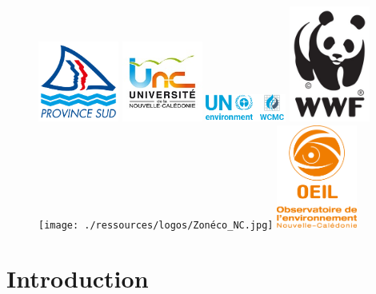 \documentclass[
  11pt,
  letterpaper,
]{scrreprt}
\begin{document}
\begin{figure}
\begin{minipage}{\linewidth}
\includegraphics[width=1.04167in,height=\textheight]{./ressources/logos/province_sud.png}
\includegraphics[width=1.04167in,height=\textheight]{./ressources/logos/UNC_160.jpg}
\includegraphics[width=1.04167in,height=\textheight]{./ressources/logos/UNEP_WCMC.PNG}
\includegraphics[width=1.04167in,height=\textheight]{./ressources/logos/wwf_panda_logo.jpg}
\texttt{[image: ./ressources/logos/Zonéco\_NC.jpg]}
\includegraphics[width=1.04167in,height=\textheight]{./ressources/logos/OEIL.png}\end{minipage}%

\end{figure}%


\chapter*{Introduction}\label{introduction}

\end{document}
